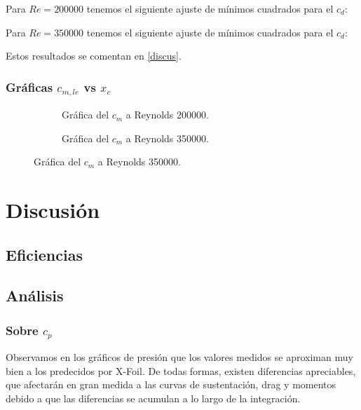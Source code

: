 \documentclass{article}
\begin{document}
Para $Re = 200000$ tenemos el siguiente ajuste de mínimos cuadrados para el $c_d$:



Para $Re = 350000$ tenemos el siguiente ajuste de mínimos cuadrados para el $c_d$:



Estos resultados se comentan en \ref{discus}.

\subsubsection{Gráficas \texorpdfstring{$c_{m,le}$}{momentos} vs \texorpdfstring{$x_c$}{posición}}

\begin{figure}[H]
    \centering
    \begin{subfigure}{.48\textwidth}
        \resizebox{\linewidth}{!}{}
        \caption{Gráfica del $c_{m}$ a Reynolds 200000. }
        \label{fig:res13}    
    \end{subfigure}
    \hspace{0cm}
    \begin{subfigure}{.48\textwidth}
        \resizebox{\linewidth}{!}{}
        \caption{Gráfica del $c_{m}$ a Reynolds 350000. }
        \label{fig:res14}     
    \end{subfigure}
\end{figure}
\section{Discusión}

\subsection{Eficiencias}

\subsection{Análisis}

\subsubsection{Sobre \texorpdfstring{$c_{p}$}{presiones}}

Observamos en los gráficos de presión que los valores medidos se aproximan muy bien a los predecidos 
por X-Foil. De todas formas, existen diferencias apreciables, que afectarán en gran medida a las curvas 
de sustentación, drag y momentos debido a que las diferencias se acumulan a lo largo de la integración.
\end{document}
